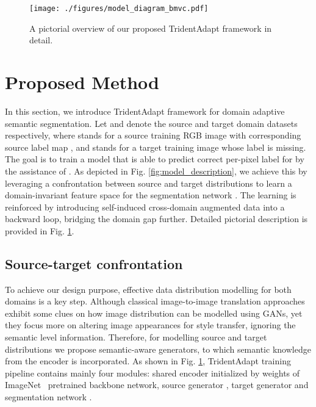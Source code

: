 \documentclass{bmvc2k}
\newcommand{\Fig}[1]{Fig. \ref{fig:#1}}
\begin{document}
\begin{figure}[]
\centering
\texttt{[image: ./figures/model\_diagram\_bmvc.pdf]}
\caption{A pictorial overview of our proposed TridentAdapt framework in detail.}
\label{fig:model_diagram}
\vspace{-3.5mm}
\end{figure}



\vspace{-3.5mm}
\section{Proposed Method}
\label{sec:proposed_method}
In this section, we introduce TridentAdapt framework for domain adaptive semantic segmentation. Let  and  denote the source and target domain datasets respectively, where  stands for a source training RGB image with corresponding source label map , and  stands for a target training image whose label  is missing. The goal is to train a model that is able to predict correct per-pixel label for  by the assistance of . As depicted in \Fig{model_description}, we achieve this by leveraging a confrontation between source and target distributions to learn a domain-invariant feature space for the segmentation network . The learning is reinforced by introducing self-induced cross-domain augmented data into a backward loop, bridging the domain gap further. Detailed pictorial description is provided in \Fig{model_diagram}.

\subsection{Source-target confrontation}
\label{sec:source-target}
To achieve our design purpose, effective data distribution modelling for both domains is a key step. Although classical image-to-image translation approaches~\cite{huang2018multimodal, liu2017unsupervised, zhu2017unpaired} exhibit some clues on how image distribution can be modelled using GANs, yet they focus more on altering image appearances for style transfer, ignoring the semantic level information. Therefore, for modelling source and target distributions we propose semantic-aware generators, to which semantic knowledge from the encoder is incorporated. As shown in \Fig{model_diagram}, TridentAdapt training pipeline contains mainly four modules: shared encoder  initialized by weights of ImageNet~\cite{deng2009imagenet} pretrained backbone network, source generator , target generator  and segmentation network . 
\end{document}
